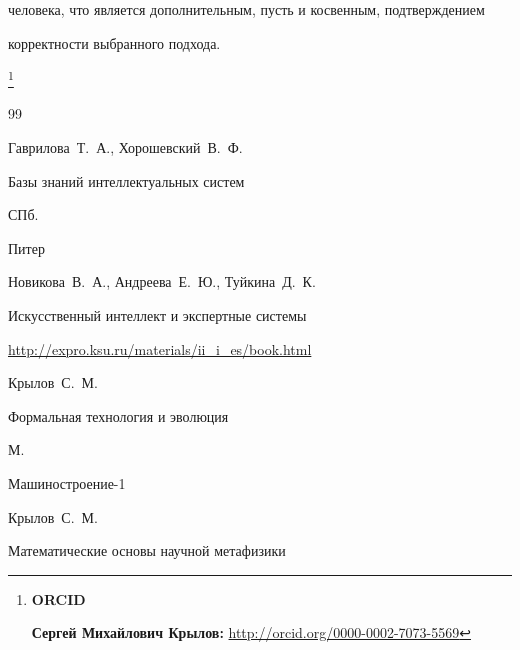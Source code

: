 человека, что является дополнительным, пусть и косвенным, подтверждением

корректности выбранного подхода.





\thanks{{\bf ORCID}



{\bf Сергей Михайлович Крылов:}     \url{http://orcid.org/0000-0002-7073-5569}





}



\RusRef



\begin{thebibliography}{99}




\by Гаврилова~Т.~А., Хорошевский~В.~Ф.

\book Базы знаний интеллектуальных систем

\publaddr СПб.

\publ Питер






\by Новикова~В.~А., Андреева~Е.~Ю., Туйкина~Д.~К.

\preprint Искусственный интеллект и экспертные системы


\elink \url{http://expro.ksu.ru/materials/ii_i_es/book.html}






\by Крылов~С.~М.

\book Формальная технология и эволюция

\publ М.

\publaddr Машиностроение-1








\by Крылов~С.~М.

\paper Математические основы научной метафизики


\end{thebibliography}
